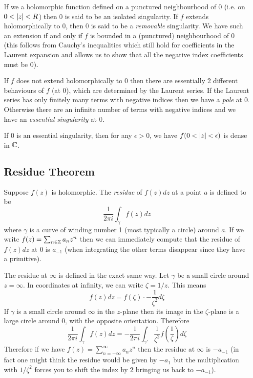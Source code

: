 If we a holomorphic function defined on a punctured neighbourhood of 0 (i.e. on $0 < \left|z\right| < R$) then 0 is said to be an isolated singularity. If $f$ extends holomorphically to 0, then 0 is said to be a \textit{removable} singularity. We have such an extension if and only if $f$ is bounded in a (punctured) neighbourhood of 0 (this follows from Cauchy's inequalities which still hold for coefficients in the Laurent expansion and allows us to show that all the negative index coefficients must be 0). 

If $f$ does not extend holomorphically to 0 then there are essentially 2 different behaviours of $f$ (at 0), which are determined by the Laurent series. If the Laurent series has only finitely many terms with negative indices then we have a \textit{pole} at 0. Otherwise there are an infinite number of terms with negative indices and we have an \textit{essential singularity} at 0.

\begin{theorem}\label{thm:ess-sing-dense}
    If 0 is an essential singularity, then for any $\epsilon > 0$, we have $f(0 < \left|z\right| < \epsilon)$ is dense in $\mathbb{C}$.
\end{theorem}

\subsection{Residue Theorem}
Suppose $f(z)$ is holomorphic. The \textit{residue} of $f(z) dz$ at a point $a$ is defined to be
$$\frac{1}{2\pi i}\int_{\gamma} f(z) dz$$
where $\gamma$ is a curve of winding number 1 (most typically a circle) around $a$. If we write $f(z) = \sum_{n \in \mathbb{Z}} a_n z^n$ then we can immediately compute that the residue of $f(z) dz$ at 0 is $a_{-1}$ (when integrating the other terms disappear since they have a primitive).

The residue at $\infty$ is defined in the exact same way. Let $\gamma$ be a small circle around $z = \infty$. In coordinates at infinity, we can write $\zeta = 1/z$. This means
$$f(z) dz = f(\zeta) \cdot -\frac{1}{\zeta^2} d\zeta$$
If $\gamma$ is a small circle around $\infty$ in the $z$-plane then its image in the $\zeta$-plane is a large circle around 0, with the opposite orientation. Therefore
$$\frac{1}{2\pi i} \int_\gamma f(z) dz = -\frac{1}{2\pi i} \int_{\gamma '} \frac{1}{\zeta^2} f \left( \frac{1}{\zeta} \right) d \zeta$$
Therefore if we have $f(z) = \sum_{n = -\infty}^\infty a_n z^n$ then the residue at $\infty$ is $-a_{-1}$ (in fact one might think the residue would be given by $-a_1$ but the multiplication with $1/\zeta^2$ forces you to shift the index by 2 bringing us back to $-a_{-1}$).

